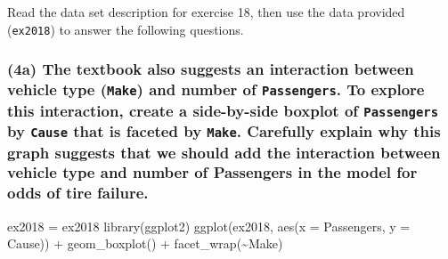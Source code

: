 \documentclass[
]{article}
\newenvironment{Shaded}{\begin{snugshade}}{\end{snugshade}}
\newcommand{\AttributeTok}[1]{\textcolor[rgb]{0.77,0.63,0.00}{#1}}
\newcommand{\FunctionTok}[1]{\textcolor[rgb]{0.00,0.00,0.00}{#1}}
\newcommand{\NormalTok}[1]{#1}
\newcommand{\OtherTok}[1]{\textcolor[rgb]{0.56,0.35,0.01}{#1}}
\newcommand{\SpecialCharTok}[1]{\textcolor[rgb]{0.00,0.00,0.00}{#1}}
\begin{document}
Read the data set description for exercise 18, then use the data
provided (\texttt{ex2018}) to answer the following questions.

\hypertarget{a-the-textbook-also-suggests-an-interaction-between-vehicle-type-make-and-number-of-passengers.-to-explore-this-interaction-create-a-side-by-side-boxplot-of-passengers-by-cause-that-is-faceted-by-make.-carefully-explain-why-this-graph-suggests-that-we-should-add-the-interaction-between-vehicle-type-and-number-of-passengers-in-the-model-for-odds-of-tire-failure.}{%
\subsubsection{\texorpdfstring{(4a) The textbook also suggests an
interaction between vehicle type (\texttt{Make}) and number of
\texttt{Passengers}. To explore this interaction, create a side-by-side
boxplot of \texttt{Passengers} by \texttt{Cause} that is faceted by
\texttt{Make}. Carefully explain why this graph suggests that we should
add the interaction between vehicle type and number of Passengers in the
model for odds of tire
failure.}{(4a) The textbook also suggests an interaction between vehicle type (Make) and number of Passengers. To explore this interaction, create a side-by-side boxplot of Passengers by Cause that is faceted by Make. Carefully explain why this graph suggests that we should add the interaction between vehicle type and number of Passengers in the model for odds of tire failure.}}\label{a-the-textbook-also-suggests-an-interaction-between-vehicle-type-make-and-number-of-passengers.-to-explore-this-interaction-create-a-side-by-side-boxplot-of-passengers-by-cause-that-is-faceted-by-make.-carefully-explain-why-this-graph-suggests-that-we-should-add-the-interaction-between-vehicle-type-and-number-of-passengers-in-the-model-for-odds-of-tire-failure.}}

\begin{Shaded}
\begin{Highlighting}[]
\NormalTok{ex2018 }\OtherTok{=}\NormalTok{ ex2018}
\FunctionTok{library}\NormalTok{(ggplot2)}
\FunctionTok{ggplot}\NormalTok{(ex2018, }\FunctionTok{aes}\NormalTok{(}\AttributeTok{x =}\NormalTok{ Passengers, }\AttributeTok{y =}\NormalTok{ Cause)) }\SpecialCharTok{+}
 \FunctionTok{geom\_boxplot}\NormalTok{() }\SpecialCharTok{+}
\FunctionTok{facet\_wrap}\NormalTok{(}\SpecialCharTok{\textasciitilde{}}\NormalTok{Make)}
\end{Highlighting}
\end{Shaded}
\end{document}
